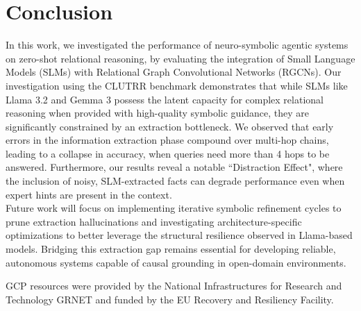 \documentclass[
]{ceurart}
\begin{document}

\section{Conclusion}
In this work,  we investigated the performance of neuro-symbolic agentic systems on zero-shot relational reasoning, by evaluating the integration of Small Language Models (SLMs) with Relational Graph Convolutional Networks (RGCNs). Our investigation using the CLUTRR benchmark demonstrates that while SLMs like Llama 3.2 and Gemma 3 possess the latent capacity for complex relational reasoning when provided with high-quality symbolic guidance, they are significantly constrained by an extraction bottleneck. We observed that early errors in the information extraction phase compound over multi-hop chains, leading to a collapse in accuracy, when queries need more than 4 hops to be answered. Furthermore, our results reveal a notable ``Distraction Effect", where the inclusion of noisy, SLM-extracted facts can degrade performance even when expert hints are present in the context.\\
Future work will focus on implementing iterative symbolic refinement cycles to prune extraction hallucinations and investigating architecture-specific optimizations to better leverage the structural resilience observed in Llama-based models. Bridging this extraction gap remains essential for developing reliable, autonomous systems capable of causal grounding in open-domain environments.


\begin{acknowledgments}
  GCP resources were provided by the National Infrastructures for Research and Technology GRNET and funded by the EU Recovery and Resiliency Facility.
\end{acknowledgments}
\end{document}
